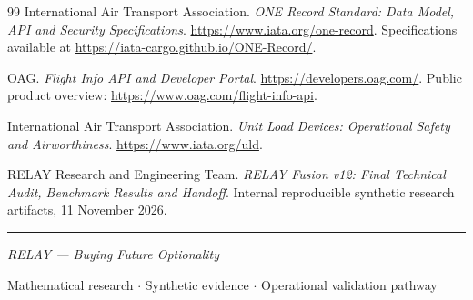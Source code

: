 \documentclass[10pt,a4paper]{article}
\theoremstyle{plain}
\theoremstyle{definition}
\theoremstyle{remark}
\begin{document}
\begin{thebibliography}{99}
International Air Transport Association.
\newblock
\emph{ONE Record Standard:
Data Model, API and Security Specifications}.
\newblock
\url{https://www.iata.org/one-record}.
\newblock
Specifications available at
\url{https://iata-cargo.github.io/ONE-Record/}.

OAG.
\newblock
\emph{Flight Info API and Developer Portal}.
\newblock
\url{https://developers.oag.com/}.
\newblock
Public product overview:
\url{https://www.oag.com/flight-info-api}.

International Air Transport Association.
\newblock
\emph{Unit Load Devices:
Operational Safety and Airworthiness}.
\newblock
\url{https://www.iata.org/uld}.

RELAY Research and Engineering Team.
\newblock
\emph{RELAY Fusion v12:
Final Technical Audit, Benchmark Results and Handoff}.
\newblock
Internal reproducible synthetic research artifacts,
11 November 2026.

\end{thebibliography}

\vspace{5pt}

\begin{center}
{\color{RuleGray}\rule{0.70\linewidth}{0.5pt}}

{\small\itshape
RELAY --- Buying Future Optionality
}

{\footnotesize
Mathematical research
\(\cdot\)
Synthetic evidence
\(\cdot\)
Operational validation pathway
}

\end{center}
\end{document}

